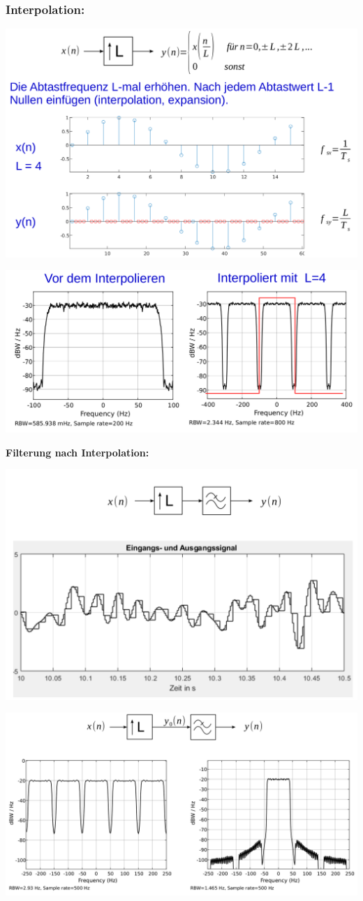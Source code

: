 \documentclass[10pt,a4paper]{article}
\begin{document}
\subsubsection{Interpolation:}

\begin{center}
  \includegraphics[width=.5\textwidth]{./img/Multirate_Interpolator.png}
\end{center} 

\begin{center}
  \includegraphics[width=.5\textwidth]{./img/Interpolator_Spektrum.png}
\end{center} 

\textbf{Filterung nach Interpolation: }\\

\begin{center}
  \includegraphics[width=.5\textwidth]{./img/Multirate_Interpolator_Filter.png}
\end{center}
\begin{center}
  \includegraphics[width=.5\textwidth]{./img/Multirate_Interpolator_Spektrum.png}
\end{center}
\end{document}
